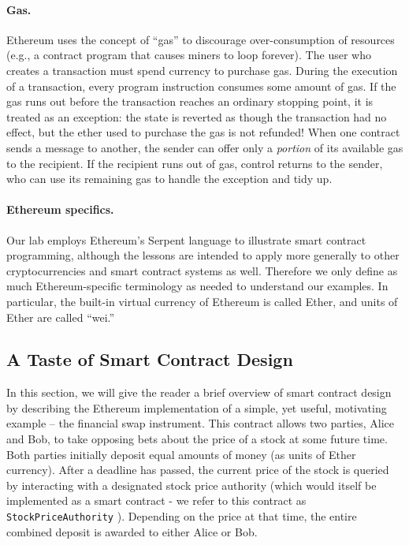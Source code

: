 \documentclass{llncs}
\begin{document}
\paragraph{Gas.}
Ethereum uses 
the concept of ``gas'' to discourage over-consumption of resources (e.g.,
a contract program that causes miners to loop forever). The user who creates a transaction must spend currency to purchase gas. During the execution of a transaction, every program instruction consumes some amount of gas. If the gas runs out before the transaction reaches an ordinary stopping point, it is treated as an exception: the state is reverted as though the transaction had no effect, but the ether used to purchase the gas is not refunded! When one contract sends a message to another, the sender can offer only a \emph{portion} of its available gas to the recipient. If the recipient runs out of gas, control returns to the sender, who can use its remaining gas to handle the exception and tidy up.


\paragraph{Ethereum specifics.}
Our lab employs Ethereum's Serpent language 
to illustrate smart contract programming, although the lessons are intended to apply more generally to other cryptocurrencies and smart contract systems as well. Therefore we only define as much Ethereum-specific terminology as needed to understand our examples. In particular, the built-in virtual currency of Ethereum is called Ether, and units of Ether are called ``wei.''

\subsection{A Taste of Smart Contract Design}

In this section, we will give the reader a brief overview of smart contract design by describing the Ethereum implementation of a simple, yet useful, motivating example -- the financial swap instrument. This contract allows two parties, Alice and Bob, to take opposing bets about the price of a stock at some future time. Both parties initially deposit equal amounts of money (as units of Ether currency). After a deadline has passed, the current price of the stock is queried by interacting with a designated stock price authority (which would itself be implemented as a smart contract - we refer to this contract as \texttt{StockPriceAuthority} ). Depending on the price at that time, the entire combined deposit is awarded to either Alice or Bob.
\end{document}
